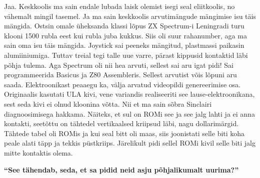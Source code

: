 Jaa. Keskkoolis ma sain endale lubada laisk olemist isegi seal eliitkoolis, no vähemalt mingil tasemel. Ja ma sain keskkoolis arvutimängude mängimise isu täis mängida. Ostsin omale üheksanda klassi lõpus ZX Spectrum-i Leningradi turu klooni 1500 rubla eest kui rubla juba kukkus. Siis oli suur rahanumber, aga ma sain oma isu täis mängida. Joystick sai peeneks mängitud, plastmassi paikasin alumiiniumiga. Tuttav treial tegi talle uue varre, pärast kippusid kontaktid läbi põhja tulema. Aga Spectrum oli nii hea arvuti, sellest sai aru igat pidi! Sai programmeerida Basicus ja  Z80 Assembleris. Sellest arvutist võis lõpuni aru saada. Elektroonikast peaaegu ka, välja arvatud videopildi genereerimise osa. Originaalis kasutati ULA kivi, vene variandis realiseeriti see lause-elektroonikana, sest seda kivi ei olnud kloonina võtta. Nii et ma sain sõbra Sinclairi diagnoosimisega hakkama. Näiteks, et sul on ROMi see ja see jalg lahti ja ei anna kontakti, seetõttu on tähtedel vertikaalsed kriipsud läbi, nagu dollarimärgid. Tähtede tabel oli ROMis ja kui seal bitt oli maas, siis joonistati selle biti koha peale alati täpp ja tekkis püstkriips. Järelikult pidi sellel ROMi kivil selle biti jalg mitte kontaktis olema.

\textbf{\enquote{See tähendab, seda, et sa pidid neid asju põhjalikumalt uurima?}}

